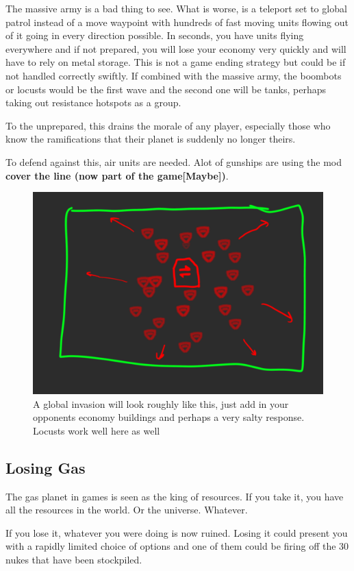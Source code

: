 \documentclass[]{article}
\begin{document}
The massive army is a bad thing to see.  What is worse, is a teleport set to global patrol instead of a move waypoint with hundreds of fast moving units flowing out of it going in every direction possible.  In seconds, you have units flying everywhere and if not prepared, you will lose your economy very quickly and will have to rely on metal storage.  This is not a game ending strategy but could be if not handled correctly swiftly.  If combined with the massive army, the boombots or locusts would be the first wave and the second one will be tanks, perhaps taking out resistance hotspots as a group.  

To the unprepared, this drains the morale of any player, especially those who know the ramifications that their planet is suddenly no longer theirs.  

To defend against this, air units are needed.  Alot of gunships are using the mod \textbf{cover the line (now part of the game[Maybe])}. 


\begin{figure}[h]
	\centering
	\includegraphics[width=0.7\linewidth]{mYZYLlR}
	\caption{A global invasion will look roughly like this, just add in your opponents economy buildings and perhaps a very salty response.  Locusts work well here as well}
	\label{fig:myzyllr}
\end{figure}



\subsection{Losing Gas}
\label{sec:losing-gas}

The gas planet in games is seen as the king of resources.  If you take it, you have all the resources in the world.  Or the universe.   Whatever.  

If you lose it, whatever you were doing is now ruined.  Losing it could present you with a rapidly limited choice of options and one of them could be firing off the 30 nukes that have been stockpiled.  
\end{document}
